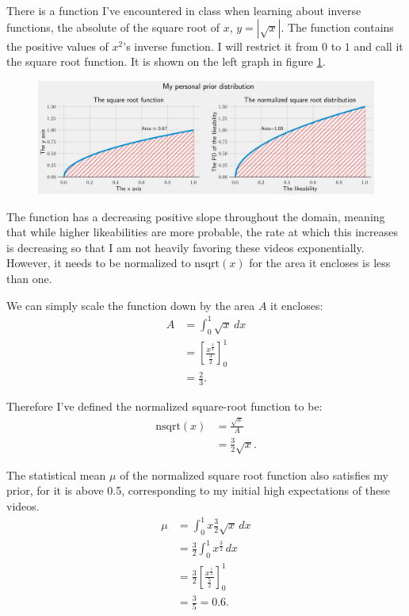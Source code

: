 \documentclass[a4paper,11pt]{article}
\newcommand*\Eval[3]{\left[#1\right]_{#3}^{#2}}
\begin{document}
There is a function I've encountered in class when learning about inverse functions, the absolute of the square root of $x$, $y=|\sqrt{x}|$. The function contains the positive values of $x^2$'s inverse function. I will restrict it from $0$ to $1$ and call it the square root function. It is shown on the left graph in figure \ref{fig:sqrt_per}.

\begin{figure}[H]
    \centering
    \includegraphics[width=\textwidth]{assets/sqrt_per.png}
    \caption{}
    \label{fig:sqrt_per}
\end{figure}

The function has a decreasing positive slope throughout the domain, meaning that while higher likeabilities are more probable, the rate at which this increases is decreasing so that I am not heavily favoring these videos exponentially. However, it needs to be normalized to $\text{nsqrt}(x)$ for the area it encloses is less than one.

We can simply scale the function down by the area $A$ it encloses:
\begin{align*}
    A &= \int_0^1 \sqrt{x} \, dx\\
    &= \Eval{\frac{x^{\frac{3}{2}}}{\frac{3}{2}}}{1}{0}\\
    &= \frac{2}{3}.
\end{align*}

Therefore I've defined the normalized square-root function to be:
\begin{align*}
     \text{nsqrt}(x) &= \frac{\sqrt{x}}{A}\\
    &= \frac{3}{2} \sqrt{x}.
\end{align*}

The statistical mean $\mu$ of the normalized square root function also satisfies my prior, for it is above 0.5, corresponding to my initial high expectations of these videos.
\begin{align*}
    \mu &= \int_0^1 x \frac{3}{2} \sqrt{x} \, dx\\
    &= \frac{3}{2} \int_0^1 x^{\frac{3}{2}} \, dx\\
    &= \frac{3}{2} \Eval{\frac{x^{\frac{5}{2}}}{\frac{5}{2}}}{1}{0}\\
    &= \frac{3}{5} = 0.6.
\end{align*}
\end{document}
